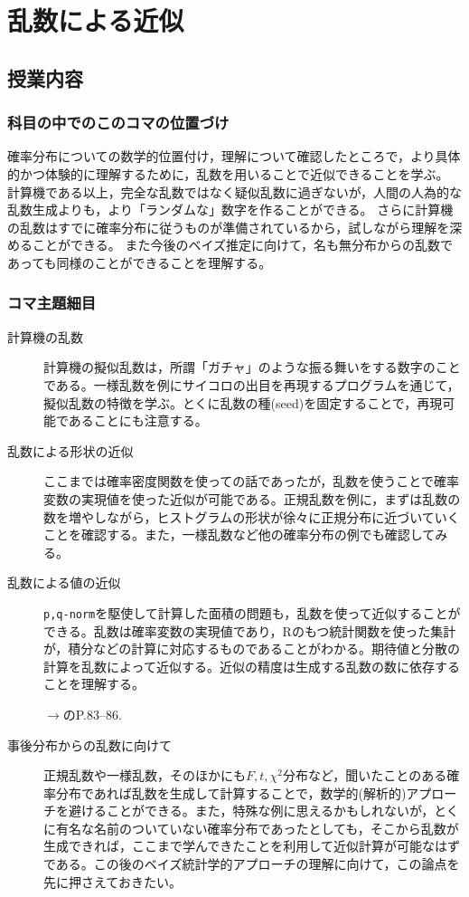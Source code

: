 \section{乱数による近似}
\subsection{授業内容}
\subsubsection{科目の中でのこのコマの位置づけ}
確率分布についての数学的位置付け，理解について確認したところで，より具体的かつ体験的に理解するために，乱数を用いることで近似できることを学ぶ。
計算機である以上，完全な乱数ではなく疑似乱数に過ぎないが，人間の人為的な乱数生成よりも，より「ランダムな」数字を作ることができる。
さらに計算機の乱数はすでに確率分布に従うものが準備されているから，試しながら理解を深めることができる。
また今後のベイズ推定に向けて，名も無分布からの乱数であっても同様のことができることを理解する。
\subsubsection{コマ主題細目}
\begin{description}
	\item[計算機の乱数] 計算機の擬似乱数は，所謂「ガチャ」のような振る舞いをする数字のことである。一様乱数を例にサイコロの出目を再現するプログラムを通じて，擬似乱数の特徴を学ぶ。とくに乱数の種(seed)を固定することで，再現可能であることにも注意する。
	\item[乱数による形状の近似] ここまでは確率密度関数を使っての話であったが，乱数を使うことで確率変数の実現値を使った近似が可能である。正規乱数を例に，まずは乱数の数を増やしながら，ヒストグラムの形状が徐々に正規分布に近づいていくことを確認する。また，一様乱数など他の確率分布の例でも確認してみる。
	\item[乱数による値の近似] \verb|p,q-norm|を駆使して計算した面積の問題も，乱数を使って近似することができる。乱数は確率変数の実現値であり，Rのもつ統計関数を使った集計が，積分などの計算に対応するものであることがわかる。期待値と分散の計算を乱数によって近似する。近似の精度は生成する乱数の数に依存することを理解する。
		\begin{flushright}
			$\to$\textcite{kosugi2023}のP.83--86.
		\end{flushright}
	\item[事後分布からの乱数に向けて] 正規乱数や一様乱数，そのほかにも$F,t,\chi^2$分布など，聞いたことのある確率分布であれば乱数を生成して計算することで，数学的(解析的)アプローチを避けることができる。また，特殊な例に思えるかもしれないが，とくに有名な名前のついていない確率分布であったとしても，そこから乱数が生成できれば，ここまで学んできたことを利用して近似計算が可能なはずである。この後のベイズ統計学的アプローチの理解に向けて，この論点を先に押さえておきたい。
\end{description}
